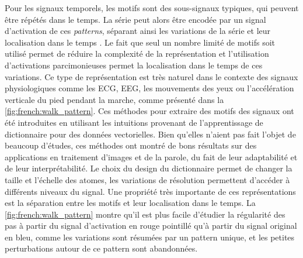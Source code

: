 \documentclass[../thesis.tex]{subfiles}
\begin{document}
	Pour les signaux temporels, les motifs sont des sous-signaux typiques, qui peuvent
	être répétés dans le temps. La série peut alors être encodée par un signal d'activation
	de ces \emph{patterns}, séparant ainsi les variations de la série et leur localisation dans le
	temps \citep{Vautard1989, Grosse2007}. Le fait que seul un nombre limité de motifs
	soit utilisé permet de réduire
	la complexité de la représentation et l'utilisation d'activations parcimonieuses permet
	la localisation dans le temps de ces variations. Ce type de représentation est très
	naturel dans le contexte des signaux physiologiques comme les ECG, EEG, les mouvements
	des yeux ou l'accélération verticale du pied pendant la marche, comme présenté dans
	la \autoref{fig:french:walk_pattern}. Ces méthodes pour extraire des motifs des signaux
	ont été introduites en utilisant les intuitions provenant de l'apprentissage de dictionnaire
	pour des données vectorielles. Bien qu'elles n'aient pas fait l'objet de beaucoup d'études,
	ces méthodes ont montré de bons résultats sur des applications en traitement d'images et
	de la parole, du fait de leur adaptabilité et de leur interprétabilité. Le choix du design
	du dictionnaire permet de changer la taille et l'échelle des atomes, les variations de
	résolution permettent d'accéder à différents niveaux du signal. Une propriété très importante
	de ces représentations est la séparation entre les motifs et leur localisation dans le
	temps. La \autoref{fig:french:walk_pattern} montre qu'il est plus facile d'étudier la régularité
	des pas à partir du signal d'activation en rouge pointillé qu'à partir du signal original
	en bleu, comme les variations sont résumées par un pattern unique, et les petites
	perturbations autour de ce pattern sont abandonnées.






\biblio{}
\end{document}
